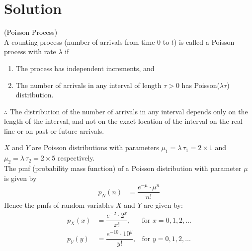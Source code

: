 \documentclass[journal,12pt,twocolumn]{IEEEtran}
\begin{document}
\section{Solution}
\begin{definition}\label{poisson_process}
(Poisson Process)\\
A counting process (number of arrivals from time $0$ to $t$) is called a Poisson process with rate $\lambda$ if
\begin{enumerate}[label=(\roman*)]
    \item The process has independent increments, and
    \item The number of arrivals in any interval of length $\tau > 0$ has Poisson($\lambda \tau$) distribution.
\end{enumerate}
$\therefore$ The distribution of the number of arrivals in any interval depends only on the length of the interval, and not on the exact location of the interval on the real line or on past or future arrivals.
\end{definition}
\begin{definition}
    $X$ and $Y$ are Poisson distributions with parameters $\mu_1 = \lambda \, \tau_1 = 2 \times 1$ and $\mu_2 = \lambda \, \tau_2 = 2 \times 5$ respectively. \\
    The pmf (probability mass function) of a Poisson distribution with parameter $\mu$ is given by
    \begin{align}
        p_N(n) &= \dfrac{e^{-\mu}\cdot \mu^{n}}{n!}
    \end{align}
    Hence the pmfs of random variables $X$ and $Y$ are given by:
    \begin{align}
        p_X(x) &= \dfrac{e^{-2}\cdot 2^{x}}{x!}, & \text{for } x=0,1,2,\dots \label{pmf(X)}\\
        p_Y(y) &= \dfrac{e^{-10}\cdot 10^{y}}{y!}, & \text{for } y=0,1,2,\dots \label{pmf(Y)}
    \end{align}
\end{definition}
    
\end{document}
